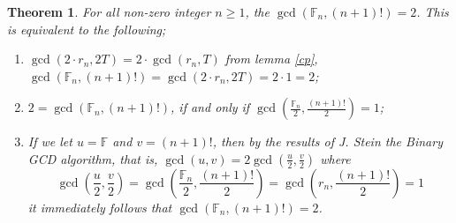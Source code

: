 \documentclass[pdflatex,sn-mathphys-num]{sn-jnl}%
\newtheorem{theorem}{Theorem}
\theoremstyle{thmstyleone}%
\theoremstyle{thmstyletwo}%
\theoremstyle{thmstylethree}%
\begin{document}
\begin{theorem}\label{Equ}
For all non-zero integer $n\geq 1$, the $\gcd(\mathbb{F}_{n},(n+1)!)=2$. This is equivalent to the following; 
    \begin{enumerate}
        \item[(a)] $\gcd(2\cdotp r_{n},2T)=2\cdotp \gcd(r_{n},T)$ from lemma \ref{cp},\\ $\gcd(\mathbb{F}_{n},(n+1)!)=\gcd(2\cdotp r_{n},2T)=2\cdotp 1= 2$;
        \item[(b)]  $2=\gcd(\mathbb{F}_{n},(n+1)!)$, if and only if $\gcd\left (\frac{\mathbb{F}_{n}}{2},\frac{(n+1)!}{2}\right)=1$;
        \item[(c)] If we let $u=\mathbb{F}$ and $v=(n+1)!$, then by the results of J. Stein \cite{stein1967computational} the Binary GCD algorithm, that is,  $\gcd(u,v)=2\gcd(\frac{u}{2}, \frac{v}{2})$ where $$\gcd\left(\frac{u}{2}, \frac{v}{2}\right)=\gcd\left(\frac{\mathbb{F}_{n}}{2}, \frac{(n+1)!}{2}\right)=\gcd \left(r_n, \frac{(n+1)!}{2}\right)=1$$
        it immediately follows that $\gcd(\mathbb{F}_{n},(n+1)!)=2$.
    \end{enumerate}
\end{theorem}
\end{document}

